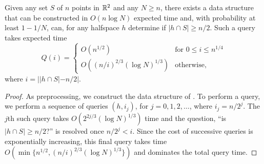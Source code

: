 \documentclass{cccg12}
\begin{document}
\begin{lem}
  Given any set $S$ of $n$ points in $\mathbb{R}^2$ and any $N\ge n$, there
  exists a data structure that can be constructed in $O(n\log N)$
  expected time and, with probability at least $1-1/N$, can, for any
  halfspace $h$ determine if $|h\cap S|\ge n/2$.  Such a query takes
  expected time 
  \[  Q(i) = \begin{cases}
        O(n^{1/2}) & \text{for $0\le i\le n^{1/4}$} \\
        O((n/i)^{2/3}(\log N)^{1/3}) & \text{otherwise, }
    \end{cases}
  \]
  where $i = ||h\cap S|-n/2|$.
\end{lem}

\begin{proof}
  As preprocessing, we construct the data structure of
  .  To perform a query, we perform a
  sequence of queries $(h,i_j)$, for $j=0,1,2,\ldots$, where $i_j=n/2^j$.
  The $j$th such query takes $O(2^{2j/3}(\log N)^{1/3})$ time and the question,
  ``is $|h\cap S|\ge n/2$?'' is resolved once $n/2^j < i$.  Since the cost
  of successive queries is exponentially increasing, this final query
  takes time $O(\min\{n^{1/2},(n/i)^{2/3}(\log N)^{1/3}\})$ and dominates the
  total query time.
\end{proof}
\end{document}
